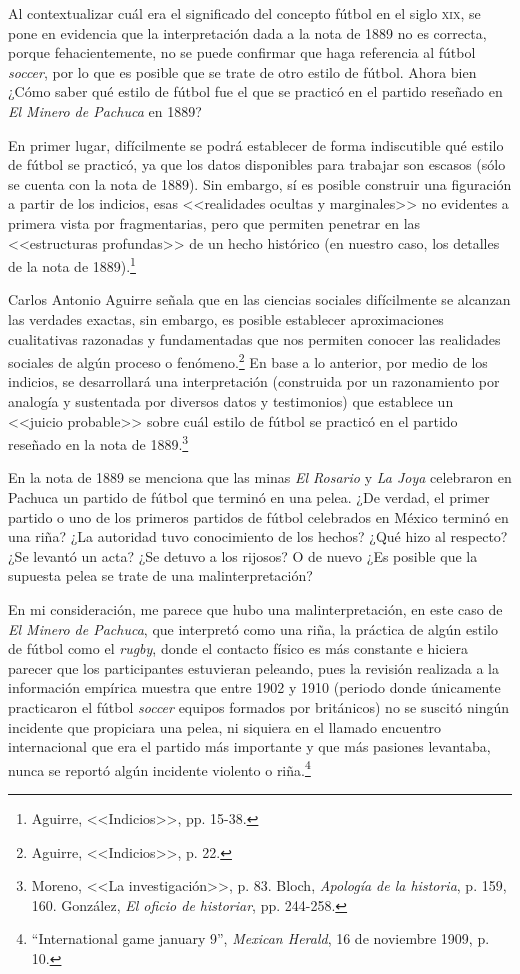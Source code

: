 \documentclass[11pt,a5paper,twoside]{book} %
\begin{document}
Al contextualizar cuál era el significado del concepto fútbol en el siglo \textsc{xix}, se pone en evidencia que la interpretación dada a la nota de 1889 no es correcta, porque fehacientemente, no se puede confirmar que haga referencia al fútbol \emph{soccer}, por lo que es posible que se trate de otro estilo de fútbol. Ahora bien ¿Cómo saber qué estilo de fútbol fue el que se practicó en el partido reseñado en \emph{El Minero de Pachuca} en 1889?

En primer lugar, difícilmente se podrá establecer de forma indiscutible qué estilo de fútbol se practicó, ya que los datos disponibles para trabajar son escasos (sólo se cuenta con la nota de 1889). Sin embargo, sí es posible construir una figuración a partir de los indicios, esas <<realidades ocultas y marginales>> no evidentes a primera vista por fragmentarias, pero que permiten penetrar en las <<estructuras profundas>> de un hecho histórico (en nuestro caso, los detalles de la nota de 1889).\footnote{Aguirre, <<Indicios>>, pp. 15-38.}

Carlos Antonio Aguirre señala que en las ciencias sociales difícilmente se alcanzan las verdades exactas, sin embargo, es posible establecer aproximaciones cualitativas razonadas y fundamentadas que nos permiten conocer las realidades sociales de algún proceso o fenómeno.\footnote{Aguirre, <<Indicios>>, p. 22.} En base a lo anterior, por medio de los indicios, se desarrollará una interpretación (construida por un razonamiento por analogía y sustentada por diversos datos y testimonios) que establece un <<juicio probable>> sobre cuál estilo de fútbol se practicó en el partido reseñado en la nota de 1889.\footnote{Moreno, <<La investigación>>, p. 83. Bloch, \emph{Apología de la historia}, p. 159, 160. González, \emph{El oficio de historiar}, pp. 244-258.}

En la nota de 1889 se menciona que las minas \emph{El Rosario} y \emph{La Joya} celebraron en Pachuca un partido de fútbol que terminó en una pelea. ¿De verdad, el primer partido o uno de los primeros partidos de fútbol celebrados en México terminó en una riña? ¿La autoridad tuvo conocimiento de los hechos? ¿Qué hizo al respecto? ¿Se levantó un acta? ¿Se detuvo a los rijosos? O de nuevo ¿Es posible que la supuesta pelea se trate de una malinterpretación?

En mi consideración, me parece que hubo una malinterpretación, en este caso de \emph{El Minero de Pachuca}, que interpretó como una riña, la práctica de algún estilo de fútbol como el \emph{rugby}, donde el contacto físico es más constante e hiciera parecer que los participantes estuvieran peleando, pues la revisión realizada a la información empírica muestra que entre 1902 y 1910 (periodo donde únicamente practicaron el fútbol \emph{soccer} equipos formados por británicos) no se suscitó ningún incidente que propiciara una pelea, ni siquiera en el llamado encuentro internacional que era el partido más importante y que más pasiones levantaba, nunca se reportó algún incidente violento o riña.\footnote{``International game january 9'', \emph{Mexican Herald}, 16 de noviembre 1909, p. 10.}
\end{document}
